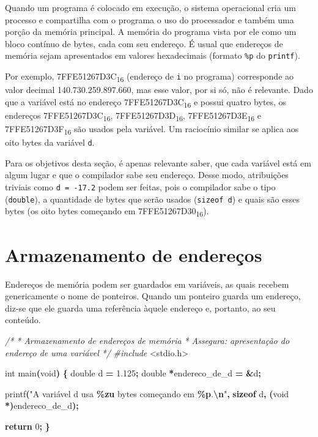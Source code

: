 \documentclass[
  11pt,
  a4paper,
]{scrbook}
\newenvironment{Shaded}{\begin{snugshade}}{\end{snugshade}}
\newcommand{\CommentTok}[1]{\textcolor[rgb]{0.56,0.35,0.01}{\textit{#1}}}
\newcommand{\ControlFlowTok}[1]{\textcolor[rgb]{0.13,0.29,0.53}{\textbf{#1}}}
\newcommand{\DataTypeTok}[1]{\textcolor[rgb]{0.13,0.29,0.53}{#1}}
\newcommand{\DecValTok}[1]{\textcolor[rgb]{0.00,0.00,0.81}{#1}}
\newcommand{\FloatTok}[1]{\textcolor[rgb]{0.00,0.00,0.81}{#1}}
\newcommand{\ImportTok}[1]{#1}
\newcommand{\KeywordTok}[1]{\textcolor[rgb]{0.13,0.29,0.53}{\textbf{#1}}}
\newcommand{\NormalTok}[1]{#1}
\newcommand{\OperatorTok}[1]{\textcolor[rgb]{0.81,0.36,0.00}{\textbf{#1}}}
\newcommand{\PreprocessorTok}[1]{\textcolor[rgb]{0.56,0.35,0.01}{\textit{#1}}}
\newcommand{\SpecialCharTok}[1]{\textcolor[rgb]{0.81,0.36,0.00}{\textbf{#1}}}
\newcommand{\StringTok}[1]{\textcolor[rgb]{0.31,0.60,0.02}{#1}}
\begin{document}
Quando um programa é colocado em execução, o sistema operacional cria um
processo e compartilha com o programa o uso do processador e também uma
porção da memória principal. A memória do programa vista por ele como um
bloco contínuo de bytes, cada com seu endereço. É usual que endereços de
memória sejam apresentados em valores hexadecimais (formato \texttt{\%p}
do \texttt{printf}).

Por exemplo, 7FFE51267D3C\textsubscript{16} (endereço de \texttt{i} no
programa) corresponde ao valor decimal 140.730.259.897.660, mas esse
valor, por si só, não é relevante. Dado que a variável está no endereço
7FFE51267D3C\textsubscript{16} e possui quatro bytes, os endereços
7FFE51267D3C\textsubscript{16}, 7FFE51267D3D\textsubscript{16},
7FFE51267D3E\textsubscript{16} e 7FFE51267D3F\textsubscript{16} são
usados pela variável. Um raciocínio similar se aplica aos oito bytes da
variável \texttt{d}.

Para os objetivos desta seção, é apenas relevante saber, que cada
variável está em algum lugar e que o compilador sabe seu endereço. Desse
modo, atribuições triviais como \texttt{d\ =\ -17.2} podem ser feitas,
pois o compilador sabe o tipo (\texttt{double}), a quantidade de bytes
que serão usados (\texttt{sizeof\ d}) e quais são esses bytes (os oito
bytes começando em 7FFE51267D30\textsubscript{16}).

\section{Armazenamento de
endereços}\label{armazenamento-de-endereuxe7os}

Endereços de memória podem ser guardados em variáveis, as quais recebem
genericamente o nome de ponteiros. Quando um ponteiro guarda um
endereço, diz-se que ele guarda uma referência àquele endereço e,
portanto, ao seu conteúdo.

\begin{Shaded}
\begin{Highlighting}[]
\CommentTok{/*}
\CommentTok{ * Armazenamento de endereços de memória}
\CommentTok{ * Assegura: apresentação do endereço de uma variável}
\CommentTok{ */}
\PreprocessorTok{\#include }\ImportTok{\textless{}stdio.h\textgreater{}}

\DataTypeTok{int}\NormalTok{ main}\OperatorTok{(}\DataTypeTok{void}\OperatorTok{)} \OperatorTok{\{}
    \DataTypeTok{double}\NormalTok{ d }\OperatorTok{=} \FloatTok{1.125}\OperatorTok{;}
    \DataTypeTok{double} \OperatorTok{*}\NormalTok{endereco\_de\_d }\OperatorTok{=} \OperatorTok{\&}\NormalTok{d}\OperatorTok{;}
    
\NormalTok{    printf}\OperatorTok{(}\StringTok{"A variável d usa }\SpecialCharTok{\%zu}\StringTok{ bytes começando em }\SpecialCharTok{\%p}\StringTok{.}\SpecialCharTok{\textbackslash{}n}\StringTok{"}\OperatorTok{,} \KeywordTok{sizeof}\NormalTok{ d}\OperatorTok{,}
           \OperatorTok{(}\DataTypeTok{void} \OperatorTok{*)}\NormalTok{endereco\_de\_d}\OperatorTok{);}

    \ControlFlowTok{return} \DecValTok{0}\OperatorTok{;}
\OperatorTok{\}}
\end{Highlighting}
\end{Shaded}
\end{document}
